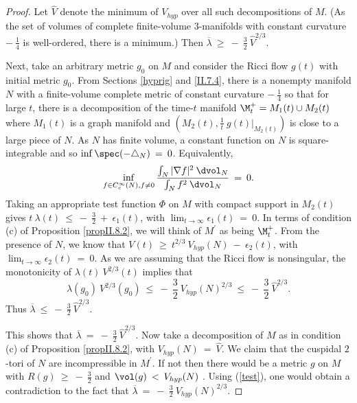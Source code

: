 \begin{proof}
Let $\widehat{V}$ denote the minimum of $V_{hyp}$ over
all such decompositions of $M$. (As the set of
volumes of complete finite-volume $3$-manifolds with constant curvature
$- \: \frac14$ is well-ordered, there is a minimum.)
Then
$\overline{\lambda} \: \ge \:
- \: \frac32 \: \widehat{V}^{2/3}$.

Next, take an arbitrary metric
$g_0$ on $M$ and consider the Ricci flow $g(t)$ with initial metric $g_0$.
From Sections \ref{hyprig} and \ref{II.7.4}, there is a
nonempty manifold $N$ with a finite-volume complete metric
of constant curvature $- \: \frac14$
so that for large $t$, there is a decomposition of the time-$t$ manifold
$\M^+_t = M_1(t) \cup M_2(t)$
where $M_1(t)$ is a graph manifold and $(M_2(t), \frac{1}{t} \: g(t) \big|_{M_2(t)})$
is close to a large
piece of $N$.
As $N$ has finite volume, a constant function on $N$ is square-integrable
and so  $\inf \spec(- \triangle_N) \: = \: 0$.
Equivalently,
\begin{equation}
\inf_{f \in C^\infty_c(N), f \neq 0}
\frac{\int_N |\nabla f|^2 \: \dvol_N}{\int_N f^2 \: \dvol_N} \: = \: 0.
\end{equation}
Taking an appropriate test function $\Phi$ on $M$ with compact
support in $M_2(t)$
gives $t \: \lambda(t) \: \le \: - \:
\frac32 \: + \: \epsilon_1(t)$, with $\lim_{t \rightarrow \infty}
\epsilon_1(t) \: = \: 0$. In terms of condition (c) of Proposition \ref{propII.8.2},
we will think of $M^\prime$ as being $\M^+_t$.
From the presence of $N$, we know that $V(t) \: \ge \:
t^{2/3} \: V_{hyp}(N) \: - \: \epsilon_2(t)$, with $\lim_{t \rightarrow \infty}
\epsilon_2(t) \: = \: 0$. As we are assuming that the Ricci flow is nonsingular,
the monotonicity of
$\lambda(t) \: V^{2/3}(t)$ implies that
\begin{equation}
\lambda(g_0) \: V^{2/3}(g_0) \: \le \: - \: \frac32 \: V_{hyp}(N)^{2/3}
 \: \le \: - \: \frac32 \: \widehat{V}^{2/3}.
 \end{equation}
Thus $\overline{\lambda} \: \le \: - \: \frac32 \: \widehat{V}^{2/3}$.

This shows that
$\overline{\lambda} \: = \: - \: \frac32 \: \widehat{V}^{2/3}$.
Now take a decomposition of $M$ as in condition (c) of Proposition \ref{propII.8.2},
with
$V_{hyp}(N) \: = \: \widehat{V}$. We claim that the cuspidal $2$-tori of $N$ are
incompressible in $M^\prime$. If not
then there would be a metric $g$ on $M$ with $R(g) \: \ge \: - \: \frac32$ and
$\vol(g) \: < \: V_{hyp}(N)$ \cite[Pf. of Theorem 2.9]{Anderson}.
Using (\ref{test}), one
would obtain a contradiction to the fact that
$\overline{\lambda} \: = \: - \: \frac32 \: V_{hyp}(N)^{2/3}$.


\end{proof}
